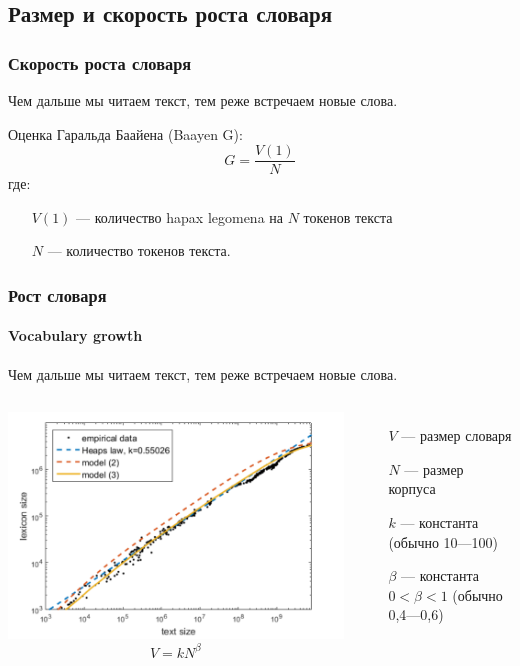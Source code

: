 \documentclass[svgnames]{beamer}
\begin{document}
\subsection{Размер и скорость роста словаря}


\begin{frame}
  \frametitle{Скорость роста словаря}
  Чем дальше мы читаем текст, тем реже встречаем новые слова.

  Оценка Гаральда Баайена (Baayen G):
  \begin{equation}
    G = \frac{V(1)}{N}
  \end{equation}
где: 
\begin{itemize}
\item[$V(1)$] — количество hapax legomena на $N$ токенов текста
\item[$N$] — количество токенов текста.
\end{itemize}
\end{frame}

\begin{frame}
  \frametitle{Рост словаря}
  \framesubtitle{Vocabulary growth}
  Чем дальше мы читаем текст, тем реже встречаем новые слова.
  \begin{columns}
    \includegraphics[width=\textwidth]{heaps-law}
  \begin{equation}
    V = kN^{\beta}
  \end{equation}
  \begin{itemize}
  \item[$V$] — размер словаря
  \item[$N$] — размер корпуса
  \item[$k$] — константа (обычно 10—100)
  \item[$\beta$] — константа $0 < \beta < 1$ (обычно 0,4—0,6)
  \end{itemize}
  \end{columns}
\end{frame}
\end{document}
